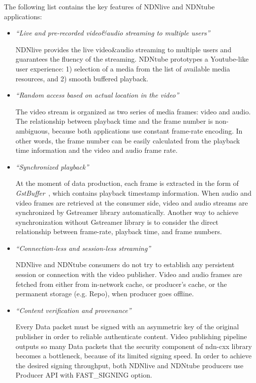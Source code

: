 The following list contains the key features of NDNlive and NDNtube applications:
\begin{itemize}
\item{\textit{``Live and pre-recorded video\&audio streaming to multiple users''}}

NDNlive provides the live video\&audio streaming to multiple users and guarantees the fluency of the streaming. NDNtube prototypes a Youtube-like user experience: 1) selection of a media from the list of available media resources, and 2) smooth buffered playback. 

\item{\textit{``Random access based on actual location in the video''}}

The video stream is organized as two series of media frames: video and audio. The relationship between playback time and the frame number is non-ambiguous, because both applications use constant frame-rate encoding. In other words, the frame number can be easily calculated from the playback time information and the video and audio frame rate. 

\item{\textit{``Synchronized playback''}}

At the moment of data production, each frame is extracted in the form of \textit{GstBuffer}~\cite{Gstbuffer}, which contains playback timestamp information. When audio and video frames are retrieved at the consumer side, video and audio streams are synchronized by Gstreamer library automatically. Another way to achieve synchronization without Gstreamer library is to consider the direct relationship between frame-rate, playback time, and frame numbers.

\item{\textit{``Connection-less and session-less streaming''}}

NDNlive and NDNtube consumers do not try to establish any persistent session or connection with the video publisher. Video and audio frames are fetched from either from in-network cache, or producer's cache, or the permanent storage (e.g. Repo), when producer goes offline.



\item{\textit{``Content verification and provenance''}}

Every Data packet must be signed with an asymmetric key of the original publisher in order to reliable authenticate content. Video publishing pipeline outputs so many Data packets that the security component of ndn-cxx library becomes a bottleneck, because of its limited signing speed. In order to achieve the desired signing throughput, both NDNlive and NDNtube producers use Producer API with FAST\_SIGNING option.

\end{itemize} 

